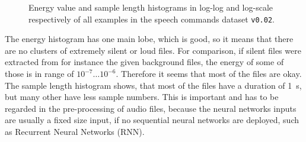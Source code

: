 \begin{figure}[!ht]
  \centering
  \caption{Energy value and sample length histograms in log-log and log-scale respectively of all examples in the speech commands dataset \texttt{v0.02}.}
  \label{fig:exp_dataset_hist}
\end{figure}
\FloatBarrier
\noindent
The energy histogram has one main lobe, which is good, so it means that there are no clusters of extremely silent or loud files.
For comparison, if silent files were extracted from for instance the given background files, the energy of some of those is in range of $10^{-7} \dots 10^{-6}$. Therefore it seems that most of the files are okay.
The sample length histogram shows, that most of the files have a duration of \SI{1}{\second}, but many other have less sample numbers. 
This is important and has to be regarded in the pre-processing of audio files, because the neural networks inputs are usually a fixed size input, if no sequential neural networks are deployed, such as Recurrent Neural Networks (RNN).



